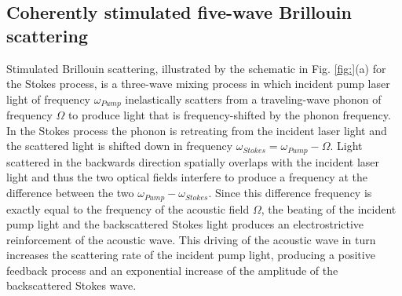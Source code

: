 \documentclass[%
  reprint,
  superscriptaddress,
  amsmath,amssymb,
  aps,
  prapplied,
]{revtex4-2}
\begin{document}
\subsection*{Coherently stimulated five-wave Brillouin scattering}\label{Theoretical Framework:Coherently stimulated five-wave Brillouin scattering}
Stimulated Brillouin scattering, illustrated by the schematic in Fig. \ref{fig:}(a) for the Stokes process, is a three-wave mixing process in which incident pump laser light of frequency $\omega_{Pump}$ inelastically scatters from a traveling-wave phonon of frequency $\Omega$ to produce light that is frequency-shifted by the phonon frequency. In the Stokes process the phonon is retreating from the incident laser light and the scattered light is shifted down in frequency $\omega_{Stokes} = \omega_{Pump} - \Omega$. Light scattered in the backwards direction spatially overlaps with the incident laser light and thus the two optical fields interfere to produce a frequency at the difference between the two $\omega_{Pump} - \omega_{Stokes}$. Since this difference frequency is exactly equal to the frequency of the acoustic field $\Omega$, the beating of the incident pump light and the backscattered Stokes light produces an electrostrictive reinforcement of the acoustic wave. This driving of the acoustic wave in turn increases the scattering rate of the incident pump light, producing a positive feedback process and an exponential increase of the amplitude of the backscattered Stokes wave.
\end{document}
